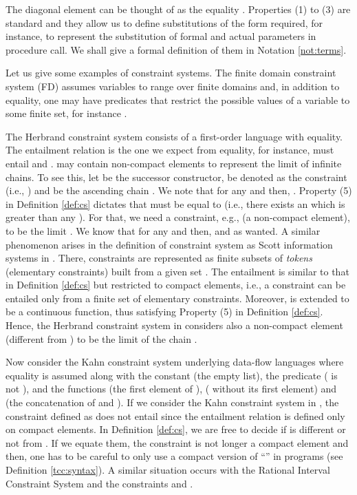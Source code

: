 \documentclass{tlp}
\begin{document}
 
 The diagonal element  can be thought of as the equality . Properties (1) to (3) are standard and  they allow us to define  substitutions of the form   required, for instance, to represent the substitution of formal and actual parameters in procedure call. We shall give a formal definition of them in Notation \ref{not:terms}. 



  Let us give some examples of constraint systems.  The finite domain constraint system  (FD) \cite{HentenryckSD98} assumes variables to range over finite domains and, in addition to equality, one may have predicates  that restrict the possible values of a variable to some finite set, for instance . 

The Herbrand constraint system   consists of a first-order language with equality. 
The entailment relation is the one we expect from equality, for instance,  must entail  and . 
  may contain non-compact elements to represent the limit of infinite chains. To see this, let  be the successor constructor,   be denoted as the constraint   (i.e., ) and   be the ascending chain  . We note that  for any  and then,  . 
Property (5) in Definition \ref{def:cs} dictates that 
 must be equal to  (i.e., there exists an  which is greater than any ). For that,  we need a constraint, e.g.,   (a non-compact element), to be the limit . We know that     for any 
and then,   and  as wanted.
A similar phenomenon arises  in the definition of constraint system   as Scott information systems in \cite{SRP91}. There,  constraints are represented as finite subsets of \emph{tokens} (elementary constraints) built from a given set . The entailment  is similar to that  in Definition \ref{def:cs} but   restricted to compact elements, i.e.,  a constraint can be entailed only from a finite set of elementary constraints. Moreover,    is extended to  be a continuous  function,  thus satisfying  Property (5) in Definition \ref{def:cs}. Hence, the  Herbrand constraint system in  \cite{SRP91}  considers also a non-compact element (different from )  to be the   limit of the chain .

Now consider the Kahn constraint system underlying data-flow languages where equality is assumed along with the constant  (the empty list), the predicate  ( is not  ),  and the functions  (the first element of ),  ( without its first element) and  (the concatenation of  and ). If we consider the Kahn constraint system in \cite{SRP91},  the constraint  defined as  does not entail      since the entailment relation is defined only on compact elements. In Definition \ref{def:cs}, we are free to decide if  is different or not from . If we equate them, the constraint  is not longer a compact element and then, one has to be careful to only use a compact version of ``'' in programs (see Definition \ref{tcc:syntax}). A similar situation occurs with the  Rational Interval Constraint System \cite{SRP91} and the constraints    and  . 
\end{document}

